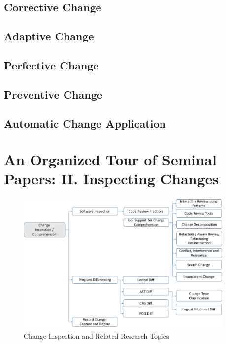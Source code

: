 \documentclass[runningheads,a4paper]{llncs}
\begin{document}
\subsection{Corrective Change}
\label{sec:corrective}
 

\subsection{Adaptive Change}
\label{sec:adaptive}
 

\subsection{Perfective Change}
\label{sec:perfective}
 

\subsection{Preventive Change}
\label{sec:preventive}
 

\subsection{Automatic Change Application}
\label{sec:automatic}
 

% 

\section{An Organized Tour of Seminal Papers: II. Inspecting Changes}
\label{sec:inspect}

\begin{figure}[ht]
 \centering
 \includegraphics[width=0.95\textwidth]{images/ChangeInspection.pdf}
 \caption{Change Inspection and Related Research Topics} 
 \label{fig:changeinspection} 
\end{figure}
\end{document}
